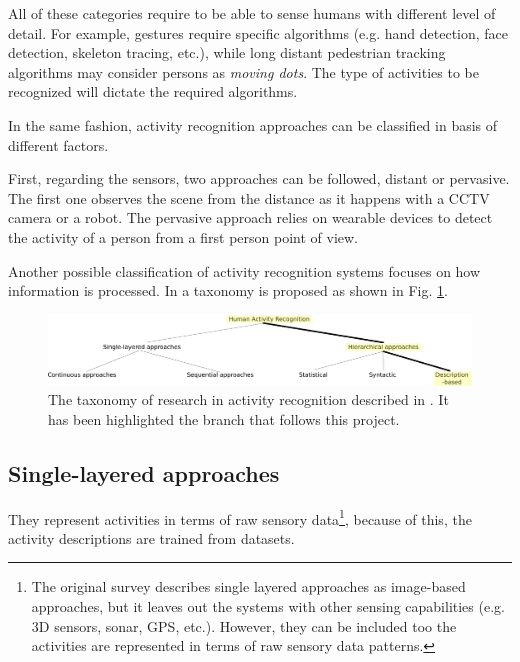 All of these categories require to be able to sense humans with different level of detail.
For example, gestures require specific algorithms (e.g. hand detection, face detection, skeleton tracing, etc.), while long distant pedestrian tracking algorithms may consider persons as \textit{moving dots}.
The type of activities to be recognized will dictate the required algorithms.

In the same fashion, activity recognition approaches can be classified in basis of different factors.

First, regarding the sensors, two approaches can be followed, distant or pervasive. 
The first one observes the scene from the distance as it happens with a CCTV camera or a robot. 
The pervasive approach relies on wearable devices to detect the activity of a person from a first person point of view.

Another possible classification of activity recognition systems focuses on how information is processed.
In \citep{Aggarwal11_HumanActivity} a taxonomy is proposed as shown in Fig. \ref{fig:taxonomy}.  

\begin{figure}[h]
\centering
\includegraphics[width=\textwidth]{fig/img_Aggarwal_Taxonomy3.pdf}
\caption{The taxonomy of research in activity recognition described in \cite{Aggarwal11_HumanActivity}. It has been highlighted the branch that follows this project.}
\label{fig:taxonomy}
\end{figure}

\subsection{Single-layered approaches}

They represent activities in terms of raw sensory data\footnote{The original survey \citep{Aggarwal11_HumanActivity} describes single layered approaches as image-based approaches, but it leaves out the systems with other sensing capabilities (e.g. 3D sensors, sonar, GPS, etc.).
However, they can be included too the activities are represented in terms of raw sensory data patterns.}, because of this, the activity descriptions are trained from datasets.


